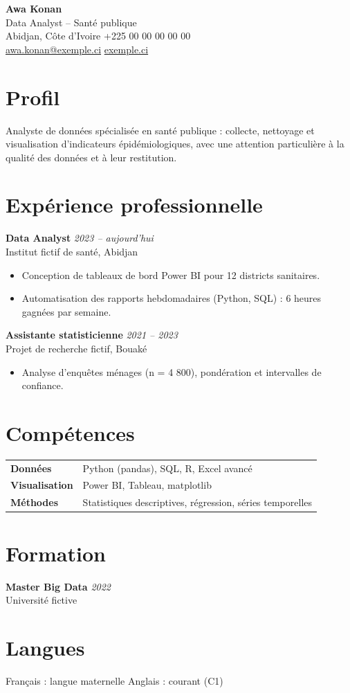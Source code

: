 \documentclass[11pt,a4paper]{article}
\newcommand{\poste}[3]{\textbf{#1} \hfill \textit{#2}\\{\color{secondaire}#3}}
\begin{document}
\begin{minipage}[t]{0.74\textwidth}
  {\LARGE\bfseries Awa Konan}\\[3pt]
  {\large\color{primaire} Data Analyst -- Santé publique}\\[6pt]
  Abidjan, Côte d'Ivoire \textbullet{} +225 00 00 00 00 00\\
  \href{mailto:awa.konan@exemple.ci}{awa.konan@exemple.ci} \textbullet{} \href{https://exemple.ci}{exemple.ci}
\end{minipage}
\hfill
\begin{minipage}[t]{0.22\textwidth}
\raggedleft
\end{minipage}

\section{Profil}
Analyste de données spécialisée en santé publique : collecte, nettoyage et visualisation d'indicateurs
épidémiologiques, avec une attention particulière à la qualité des données et à leur restitution.

\section{Expérience professionnelle}
\poste{Data Analyst}{2023 -- aujourd'hui}{Institut fictif de santé, Abidjan}
\begin{itemize}
  \item Conception de tableaux de bord Power BI pour 12 districts sanitaires.
  \item Automatisation des rapports hebdomadaires (Python, SQL) : 6 heures gagnées par semaine.
\end{itemize}
\poste{Assistante statisticienne}{2021 -- 2023}{Projet de recherche fictif, Bouaké}
\begin{itemize}
  \item Analyse d'enquêtes ménages (n = 4 800), pondération et intervalles de confiance.
\end{itemize}

\section{Compétences}
\begin{tabularx}{\textwidth}{>{\bfseries}p{3.6cm} X}
Données & Python (pandas), SQL, R, Excel avancé \\
Visualisation & Power BI, Tableau, matplotlib \\
Méthodes & Statistiques descriptives, régression, séries temporelles \\
\end{tabularx}

\section{Formation}
\poste{Master Big Data}{2022}{Université fictive}

\section{Langues}
Français : langue maternelle \textbullet{} Anglais : courant (C1)
\end{document}
